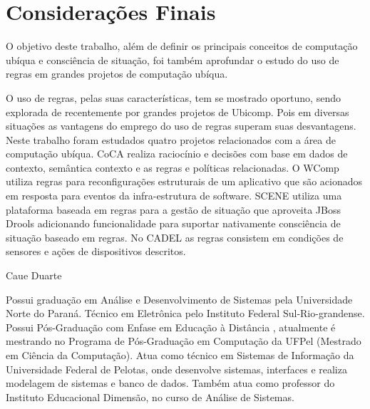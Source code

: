 \documentclass[12pt,a4paper,compsoc]{IEEEtran}
\begin{document}
\section{Considerações Finais}

  O objetivo deste trabalho, além de definir os principais conceitos de computação ubíqua e 
  consciência de situação, foi também aprofundar o estudo do uso de regras em grandes projetos de
  computação ubíqua.
  
  O uso de regras, pelas suas características, tem se mostrado oportuno, sendo explorada de 
  recentemente por grandes projetos de Ubicomp. Pois em diversas situações as vantagens do emprego
  do uso de regras superam suas desvantagens. Neste trabalho foram estudados quatro projetos
  relacionados com a área de computação ubíqua. CoCA realiza raciocínio e decisões com base em 
  dados de contexto, semântica contexto e as regras e políticas relacionadas. O WComp utiliza
  regras para reconfigurações estruturais de um aplicativo que são acionados em resposta para
  eventos da infra-estrutura de software. SCENE utiliza uma plataforma baseada em regras para a
  gestão de situação que aproveita JBoss Drools adicionando funcionalidade para suportar 
  nativamente consciência de situação baseado em regras. No CADEL as regras consistem em condições
  de sensores e ações de dispositivos descritos.






\begin{IEEEbiography}{Caue Duarte}

  Possui graduação em Análise e Desenvolvimento de Sistemas pela Universidade Norte do Paraná.
  Técnico em Eletrônica pelo Instituto Federal Sul-Rio-grandense. Possui Pós-Graduação com Enfase
  em Educação à Distância , atualmente é mestrando no Programa de Pós-Graduação em Computação da
  UFPel (Mestrado em Ciência da Computação). Atua como técnico em Sistemas de Informação da
  Universidade Federal de Pelotas, onde desenvolve sistemas, interfaces e realiza modelagem de
  sistemas e banco de dados. Também atua como professor do Instituto Educacional Dimensão, no
  curso de Análise de Sistemas. 
\end{IEEEbiography}
\end{document}
